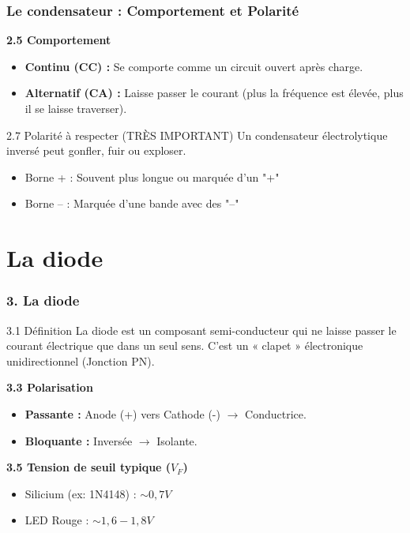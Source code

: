 \documentclass[11pt]{beamer}
\begin{document}
\begin{frame}
    \frametitle{Le condensateur : Comportement et Polarité}
    \textbf{2.5 Comportement}
    \begin{itemize}
        \item \textbf{Continu (CC) :} Se comporte comme un circuit ouvert après charge.
        \item \textbf{Alternatif (CA) :} Laisse passer le courant (plus la fréquence est élevée, plus il se laisse traverser).
    \end{itemize}
    
    \vspace{0.3cm}
    \begin{alertblock}{2.7 Polarité à respecter (TRÈS IMPORTANT)}
        Un condensateur électrolytique inversé peut gonfler, fuir ou exploser.
        \begin{itemize}
            \item Borne + : Souvent plus longue ou marquée d'un "+"
            \item Borne -- : Marquée d'une bande avec des "--"
        \end{itemize}
    \end{alertblock}
\end{frame}

\section{La diode}
\begin{frame}
    \frametitle{3. La diode}
    \begin{block}{3.1 Définition}
        La diode est un composant semi-conducteur qui ne laisse passer le courant électrique que dans un seul sens. C'est un « clapet » électronique unidirectionnel (Jonction PN).
    \end{block}

    \textbf{3.3 Polarisation}
    \begin{itemize}
        \item \textbf{Passante :} Anode (+) vers Cathode (-) $\rightarrow$ Conductrice.
        \item \textbf{Bloquante :} Inversée $\rightarrow$ Isolante.
    \end{itemize}

    \textbf{3.5 Tension de seuil typique ($V_F$)}
    \begin{itemize}
        \item Silicium (ex: 1N4148) : $\sim 0,7V$
        \item LED Rouge : $\sim 1,6 - 1,8V$
    \end{itemize}
\end{frame}
\end{document}

